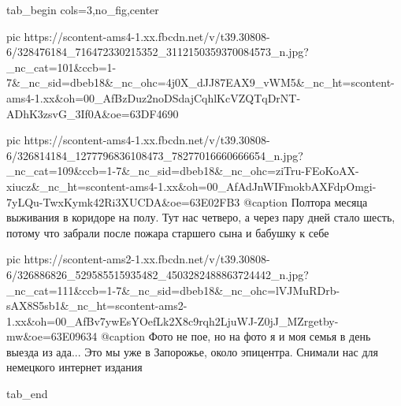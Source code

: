  
 
 
 
 


\ifcmt
  tab_begin cols=3,no_fig,center

     pic https://scontent-ams4-1.xx.fbcdn.net/v/t39.30808-6/328476184_716472330215352_3112150359370084573_n.jpg?_nc_cat=101&ccb=1-7&_nc_sid=dbeb18&_nc_ohc=4j0X_dJJ87EAX9_vWM5&_nc_ht=scontent-ams4-1.xx&oh=00_AfBzDuz2noDSdajCqhlKcVZQTqDrNT-ADhK3zsvG_3If0A&oe=63DF4690

     pic https://scontent-ams4-1.xx.fbcdn.net/v/t39.30808-6/326814184_1277796836108473_78277016660666654_n.jpg?_nc_cat=109&ccb=1-7&_nc_sid=dbeb18&_nc_ohc=ziTru-FEoKoAX-xiucz&_nc_ht=scontent-ams4-1.xx&oh=00_AfAdJnWIFmokbAXFdpOmgi-7yLQu-TwxKymk42Ri3XUCDA&oe=63E02FB3
     @caption Полтора месяца выживания в коридоре на полу. Тут нас четверо, а через пару дней стало шесть, потому что забрали после пожара старшего сына и бабушку к себе

     pic https://scontent-ams2-1.xx.fbcdn.net/v/t39.30808-6/326886826_529585515935482_4503282488863724442_n.jpg?_nc_cat=111&ccb=1-7&_nc_sid=dbeb18&_nc_ohc=lVJMuRDrb-sAX8S5sb1&_nc_ht=scontent-ams2-1.xx&oh=00_AfBv7ywEsYOefLk2X8c9rqh2LjuWJ-Z0jJ_MZrgetby-mw&oe=63E09634
     @caption Фото не пое, но на фото я и моя семья в день выезда из ада... Это мы уже в Запорожье, около эпицентра. Снимали нас для немецкого интернет издания

  tab_end
\fi
